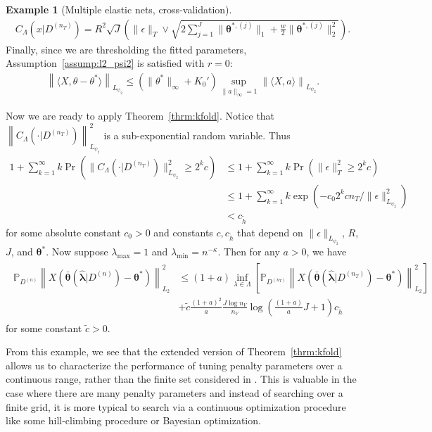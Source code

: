 \documentclass[12pt]{article} %
\theoremstyle{definition}
\newtheorem{example}{Example}
\begin{document}
\begin{example}[Multiple elastic nets, cross-validation]
	\begin{align}
	C_\Lambda(x | D^{(n_T)})
	=
	R^2
	\sqrt{J}
	\left (
	\|\epsilon\|_{T}
	\vee \sqrt{2\sum_{j=1}^J
	\|\boldsymbol{\theta}^{*,(j)}\|_1
	+ \frac{w}{2}\|\boldsymbol{\theta}^{*,(j)}\|_2^2}
	\right ).
	\end{align}
	Finally, since we are thresholding the fitted parameters, Assumption~\ref{assump:l2_psi2} is satisfied with $r = 0$:
	\begin{align}
	\left\| \langle X, \theta - \theta^* \rangle \right \|_{L_{\psi_2}}
	\le
	(\|\theta^*\|_\infty + K_0')
	\sup_{\|a\|_\infty = 1} \left\| \langle X, a \rangle \right \|_{L_{\psi_2}}.
	\end{align}
	
	Now we are ready to apply Theorem~\ref{thrm:kfold}.
	Notice that
	$\left \| C_\Lambda(\cdot | D^{(n_T)}) \right \|_{L_{\psi_2}}^2$
	is a sub-exponential random variable.
	Thus
	\begin{align}
	1 + \sum_{k = 1}^\infty k \Pr \left (
	\| C_\Lambda(\cdot | D^{(n_T)}) \|_{L_{\psi_2}}^2 \ge 2^k c
	\right )
	& \le
	1 + \sum_{k = 1}^\infty k \Pr \left (
	\| \epsilon\|_T^2 \ge 2^k c
	\right )\\
	& \le
	1 + \sum_{k = 1}^\infty k \exp(- c_0 2^k c n_T / \|\epsilon\|^2_{L_{\psi_{2}}} ) \\
	& < c_{\tilde{h}}
	\end{align}
	for some absolute constant $c_0 > 0$ and constants $c, c_{\tilde{h}}$ that depend on $\|\epsilon\|_{L_{\psi_{2}}}$, $R$, $J$, and $\boldsymbol{\theta}^*$.
	Now suppose $\lambda_{\max} = 1$ and $\lambda_{\min} = n^{-\kappa}$.
	Then for any $a > 0$, we have
	\begin{align}
	\begin{split}
	\mathbb{P}_{D^{(n)}}
	\left \|
	X \left(
	\bar{\boldsymbol{\theta}}(\hat{\boldsymbol{\lambda}}|D^{(n)})
	- \boldsymbol{\theta}^*
	\right)
	\right \|_{L_{2}}^{2}
	& \le	(1+a)
	\inf_{\lambda\in\Lambda}
	\left[
	\mathbb{P}_{D^{(n_{T})}}
	\left \|
	X \left(
	\bar{\boldsymbol{\theta}}(\hat{\boldsymbol{\lambda}}|D^{(n_T)})
	- \boldsymbol{\theta}^*
	\right)
	\right \|_{L_{2}}^{2}
	\right] \\
	& + \tilde{c} \frac{\left(1+a\right)^{2}}{a}
	\frac{J\log n_{V}}{n_{V}}
	\log\left(\frac{\left(1+a\right)}{a} J +1\right)
	c_{\tilde{h}}
	\end{split}
	\end{align}
	for some constant $\tilde{c} > 0$.
	
	From this example, we see that the extended version of Theorem~\ref{thrm:kfold} allows us to characterize the performance of tuning penalty parameters over a continuous range, rather than the finite set considered in \citet{lecue2012oracle}.
	This is valuable in the case where there are many penalty parameters and instead of searching over a finite grid, it is more typical to search via a continuous optimization procedure like some hill-climbing procedure or Bayesian optimization.
	

\end{example}
\end{document}
